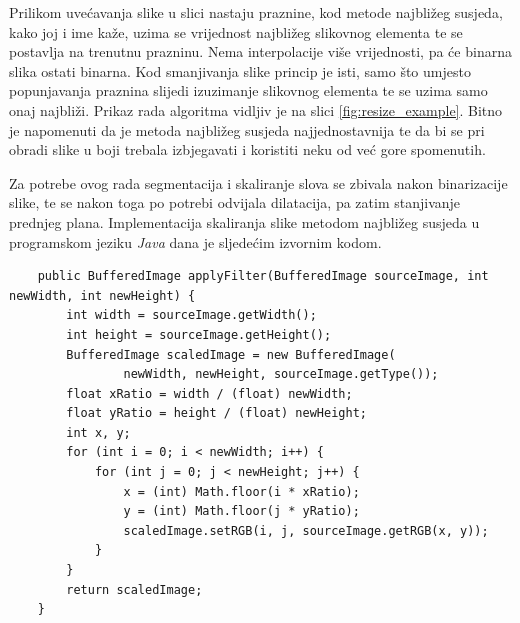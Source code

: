 Prilikom uvećavanja slike u slici nastaju praznine, kod metode najbližeg susjeda, kako joj i ime kaže, uzima se vrijednost najbližeg slikovnog elementa te se postavlja na trenutnu prazninu. Nema interpolacije više vrijednosti, pa će binarna slika ostati binarna. Kod smanjivanja slike princip je isti, samo što umjesto popunjavanja praznina slijedi izuzimanje slikovnog elementa te se uzima samo onaj najbliži. Prikaz rada algoritma vidljiv je na slici \ref{fig:resize_example}. Bitno je napomenuti da je metoda najbližeg susjeda najjednostavnija te da bi se pri obradi slike u boji trebala izbjegavati i koristiti neku od već gore spomenutih.

Za potrebe ovog rada segmentacija i skaliranje slova se zbivala nakon binarizacije slike, te se nakon toga po potrebi odvijala dilatacija, pa zatim stanjivanje prednjeg plana. Implementacija skaliranja slike metodom najbližeg susjeda u programskom jeziku \emph{Java} dana je sljedećim izvornim kodom.
\lstset{language=Java, tabsize=2}
\begin{lstlisting}
    public BufferedImage applyFilter(BufferedImage sourceImage, int newWidth, int newHeight) {
        int width = sourceImage.getWidth();
        int height = sourceImage.getHeight();
        BufferedImage scaledImage = new BufferedImage(
                newWidth, newHeight, sourceImage.getType());
        float xRatio = width / (float) newWidth;
        float yRatio = height / (float) newHeight;
        int x, y;
        for (int i = 0; i < newWidth; i++) {
            for (int j = 0; j < newHeight; j++) {
                x = (int) Math.floor(i * xRatio);
                y = (int) Math.floor(j * yRatio);
                scaledImage.setRGB(i, j, sourceImage.getRGB(x, y));
            }
        }
        return scaledImage;
    }
\end{lstlisting}